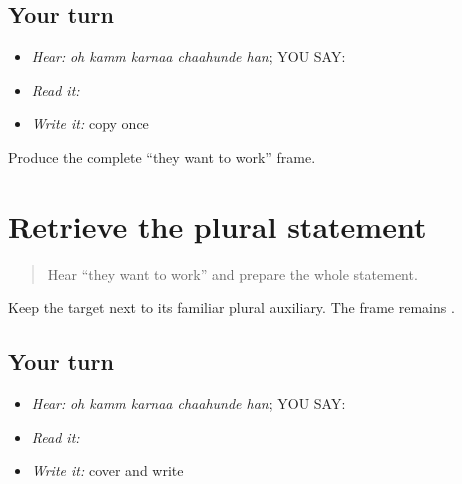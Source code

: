 \subsection*{Your turn}
\begin{itemize}
\raggedright
  \item \emph{Hear:} \emph{oh kamm karnaa chaahunde han}; YOU SAY: \textbf{    }
  \item \emph{Read it:} \textbf{    }
  \item \emph{Write it:} copy \textbf{ } once
\end{itemize}

\begin{tcolorbox}[breakable,colback=teal!4,colframe=teal!35!black,title={Before you move on}]
Produce the complete “they want to work” frame.
\end{tcolorbox}
\section[\texorpdfstring{\pa{ਉਹ} \pa{ਕੰਮ} \pa{ਕਰਨਾ} \pa{ਚਾਹੁੰਦੇ} \pa{ਹਨ} (oh kamm karnaa …)}{ਉਹ ਕੰਮ ਕਰਨਾ ਚਾਹੁੰਦੇ ਹਨ (oh kamm karnaa …)}]{Retrieve the plural statement}

\label{lesson:PA-C189-han-review}



\begin{quote}
Hear “they want to work” and prepare the whole statement.
\end{quote}

\begin{grammarlens}[title={Grammar Lens}]
Keep the target next to its familiar plural auxiliary. The frame remains \textbf{    }.
\end{grammarlens}

\subsection*{Your turn}
\begin{itemize}
\raggedright
  \item \emph{Hear:} \emph{oh kamm karnaa chaahunde han}; YOU SAY: \textbf{    }
  \item \emph{Read it:} \textbf{    }
  \item \emph{Write it:} cover and write \textbf{    }
\end{itemize}

